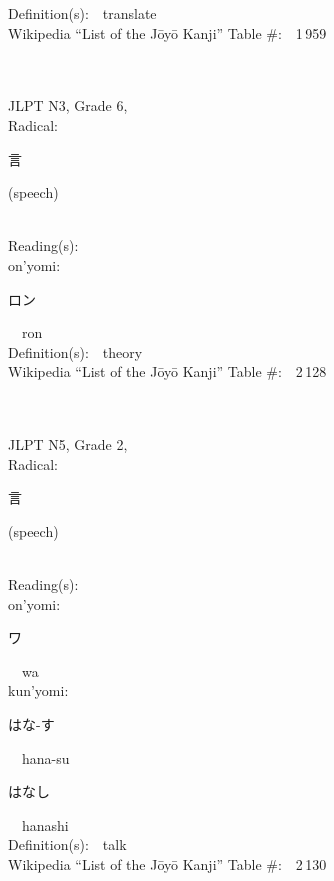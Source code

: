 \begin{multicols}{2}
Definition(s):\ \ translate \\
Wikipedia ``List of the J\=oy\=o Kanji'' Table \#:\ \ 1\,959 \\
\ \ \\
{\fontsize{34pt}{40pt}  }\ \ \\  %
{JLPT N3, Grade 6, \\Radical:\ \ {\begin{CJK}{UTF8}{min} 言 \end{CJK}} (speech) } \\
Reading(s):\ \ \\
{\hspace*{1em}}on'yomi:\ \ \\
{\hspace*{2em}}{\begin{CJK}{UTF8}{min} ロン \end{CJK}}\ \ ron\ \ \\
Definition(s):\ \ theory \\
Wikipedia ``List of the J\=oy\=o Kanji'' Table \#:\ \ 2\,128 \\
\ \ \\
{\fontsize{34pt}{40pt}  }\ \ \\  %
{JLPT N5, Grade 2, \\Radical:\ \ {\begin{CJK}{UTF8}{min} 言 \end{CJK}} (speech) } \\
Reading(s):\ \ \\
{\hspace*{1em}}on'yomi:\ \ \\
{\hspace*{2em}}{\begin{CJK}{UTF8}{min} ワ \end{CJK}}\ \ wa\ \ \\
{\hspace*{1em}}kun'yomi:\ \ \\
{\hspace*{2em}}{\begin{CJK}{UTF8}{min} はな-す \end{CJK}}\ \ hana-su\ \ \\
{\hspace*{2em}}{\begin{CJK}{UTF8}{min} はなし \end{CJK}}\ \ hanashi\ \ \\
Definition(s):\ \ talk \\
Wikipedia ``List of the J\=oy\=o Kanji'' Table \#:\ \ 2\,130 \\
\ \ \\
\end{multicols}


